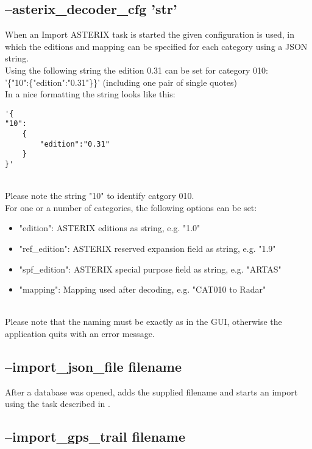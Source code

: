 \subsection{--asterix\_decoder\_cfg 'str'}

When an Import ASTERIX task is started the given configuration is used, in which the editions and mapping can be specified for each category using a JSON string. \\

Using the following string the edition 0.31 can be set for category 010:  \\
'\{"10":\{"edition":"0.31"\}\}' (including one pair of single quotes) \\

In a nice formatting the string looks like this:
\begin{lstlisting}[basicstyle=\small\ttfamily]
'{
"10":
    {
        "edition":"0.31"
    }
}'
\end{lstlisting}
\ \\

Please note the string "10" to identify catgory 010. \\

For one or a number of categories, the following options can be set:

\begin{itemize}
\item "edition":  ASTERIX editions as string, e.g. "1.0"
\item "ref\_edition":  ASTERIX reserved expansion field as string, e.g. "1.9"
\item "spf\_edition": ASTERIX special purpose field as string, e.g. "ARTAS"
\item "mapping": Mapping used after decoding, e.g. "CAT010 to Radar"
\end{itemize}
\ \\

Please note that the naming must be exactly as in the GUI, otherwise the application quits with an error message.

\subsection{--import\_json\_file filename}

After a database was opened, adds the supplied filename and starts an import using the task described in .

\subsection{--import\_gps\_trail filename}

